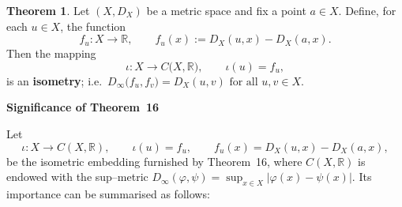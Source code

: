\documentclass[12pt]{article}
\theoremstyle{definition} %
\newtheorem{theorem}{Theorem}
\theoremstyle{plain} %
\begin{document}
\begin{theorem}\label{thm:Kuratowski_embedding}
  Let $(X,D_X)$ be a metric space and fix a point $a\in X$.
  Define, for each $u\in X$, the function
  \[
      f_u:X\longrightarrow\mathbb R,
      \qquad
      f_u(x):=D_X(u,x)-D_X(a,x).
  \]
  Then the mapping
  \[
      \iota:X\longrightarrow C\bigl(X,\mathbb R\bigr),
      \qquad
      \iota(u)=f_u,
  \]
  is an \textbf{isometry}; i.e.\
  \(
      D_\infty\!\bigl(f_u,f_v\bigr)=D_X(u,v)
      \text{ for all }u,v\in X.
  \)
\end{theorem}
\begin{center}
  \textbf{Significance of Theorem~16}
  \end{center}
  
  \smallskip
  \noindent
  Let
  \[
     \iota:X\longrightarrow C(X,\mathbb R),\qquad
     \iota(u)=f_u,\qquad
     f_u(x)=D_X(u,x)-D_X(a,x),
  \]
  be the isometric embedding furnished by Theorem~16, where
  \(C(X,\mathbb R)\) is endowed with the sup–metric
  \(D_\infty(\varphi,\psi)=\sup_{x\in X}|\varphi(x)-\psi(x)|\).
  Its importance can be summarised as follows:
  
\end{document}
